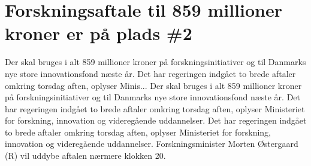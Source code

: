 \section{Forskningsaftale til 859 millioner kroner er på plads \#2}
\label{JVFLMatch2}
Der skal bruges i alt 859 millioner kroner på forskningsinitiativer og til Danmarks nye store innovationsfond næste år. Det har regeringen indgået to brede aftaler omkring torsdag aften, oplyser Minis... Der skal bruges i alt 859 millioner kroner på forskningsinitiativer og til Danmarks nye store innovationsfond næste år. Det har regeringen indgået to brede aftaler omkring torsdag aften, oplyser Ministeriet for forskning, innovation og videregående uddannelser. Det har regeringen indgået to brede aftaler omkring torsdag aften, oplyser Ministeriet for forskning, innovation og videregående uddannelser. Forskningsminister Morten Østergaard (R) vil uddybe aftalen nærmere klokken 20.


